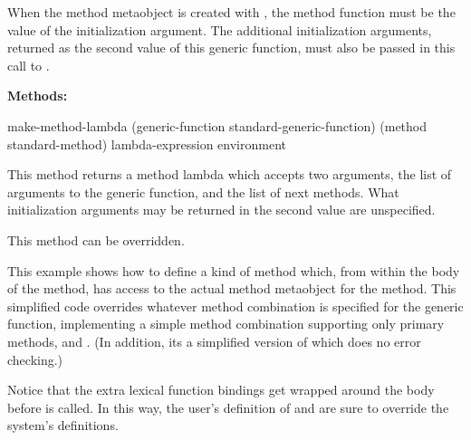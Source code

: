 \begin{defun}
When the method metaobject is created with , the method
function must be the value of the  initialization argument. The
additional initialization arguments, returned as the second value of this
generic function, must also be passed in this call to .

\textbf{Methods:}

\begin{defun}
make-method-lambda (generic-function standard-generic-function) (method
   standard-method) lambda-expression environment

This method returns a method lambda which accepts two arguments, the list of
arguments to the generic function, and the list of next methods. What
initialization arguments may be returned in the second value are unspecified.

This method can be overridden.

This example shows how to define a kind of method which, from within the body of
the method, has access to the actual method metaobject for the method. This
simplified code overrides whatever method combination is specified for the
generic function, implementing a simple method combination supporting only
primary methods,  and . (In addition,
its a simplified version of  which does no error
checking.)

Notice that the extra lexical function bindings get wrapped around the body
before  is called. In this way, the user's definition of
 and  are sure to override the system's
definitions.


\end{defun}
\end{defun}
